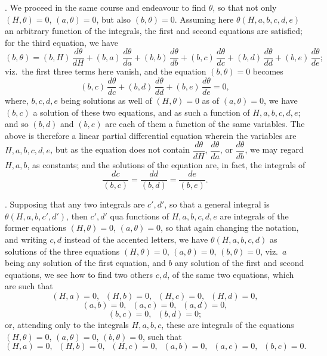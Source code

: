 \documentclass[11pt,a4paper]{article}
\begin{document}
. We proceed in the same course and endeavour to find $\theta$, so that not only $(H, \theta) = 0$, $(a, \theta) = 0$, but also $(b, \theta) = 0$. Assuming here $\theta(H, a, b, c, d, e)$ an arbitrary function of the integrals, the first and second equations are satisfied; for the third equation, we have
\[
(b, \theta) = (b, H)\,\frac{d\theta}{dH} + (b, a)\,\frac{d\theta}{da} + (b, b)\,\frac{d\theta}{db} + (b, c)\,\frac{d\theta}{dc} + (b, d)\,\frac{d\theta}{dd} + (b, e)\,\frac{d\theta}{de};
\]
viz.\ the first three terms here vanish, and the equation $(b, \theta) = 0$ becomes
\[
(b, c)\,\frac{d\theta}{dc} + (b, d)\,\frac{d\theta}{dd} + (b, e)\,\frac{d\theta}{de} = 0,
\]
where, $b, c, d, e$ being solutions as well of $(H, \theta) = 0$ as of $(a, \theta) = 0$, we have $(b, c)$ a solution of these two equations, and as such a function of $H, a, b, c, d, e$; and so $(b, d)$ and $(b, e)$ are each of them a function of the same variables. The above is therefore a linear partial differential equation wherein the variables are $H, a, b, c, d, e$, but as the equation does not contain $\dfrac{d\theta}{dH}$, $\dfrac{d\theta}{da}$, or $\dfrac{d\theta}{db}$, we may regard $H, a, b$, as constants; and the solutions of the equation are, in fact, the integrals of
\[
\frac{dc}{(b, c)} = \frac{dd}{(b, d)} = \frac{de}{(b, e)}.
\]

\newpage


. Supposing that any two integrals are $c', d'$, so that a general integral is $\theta(H, a, b, c', d')$, then $c', d'$ qua functions of $H, a, b, c, d, e$ are integrals of the former equations $(H, \theta) = 0$, $(a, \theta) = 0$, so that again changing the notation, and writing $c, d$ instead of the accented letters, we have $\theta(H, a, b, c, d)$ as solutions of the three equations $(H, \theta) = 0$, $(a, \theta) = 0$, $(b, \theta) = 0$, viz.\ $a$ being any solution of the first equation, and $b$ any solution of the first and second equations, we see how to find two others $c, d$, of the same two equations, which are such that
\[
(H, a) = 0, \;\; (H, b) = 0, \;\; (H, c) = 0, \;\; (H, d) = 0,
\]
\[
(a, b) = 0, \;\; (a, c) = 0, \;\; (a, d) = 0,
\]
\[
(b, c) = 0, \;\; (b, d) = 0;
\]
or, attending only to the integrals $H, a, b, c$, these are integrals of the equations $(H, \theta) = 0$, $(a, \theta) = 0$, $(b, \theta) = 0$, such that
\[
(H, a) = 0, \;\; (H, b) = 0, \;\; (H, c) = 0, \;\; (a, b) = 0, \;\; (a, c) = 0, \;\; (b, c) = 0.
\]
\end{document}
